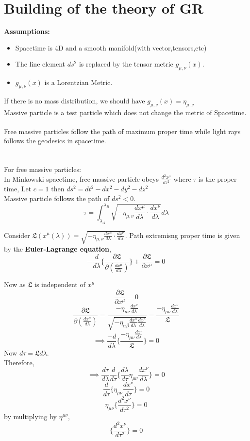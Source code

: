 \documentclass{article}
\begin{document}
\section{Building of the theory of GR}
\textbf{Assumptions: }
\begin{itemize}
    \item Spacetime is 4D and a smooth manifold(with vector,tensors,etc)
    \item The line element $ds^2$ is replaced by the tensor metric $g_{\mu,\nu}(x)$.
    \item $g_{\mu,\nu}(x)$ is a Lorentzian Metric.
\end{itemize} 
If there is no mass distribution, we should have $g_{\mu,\nu}(x)=\eta_{\mu,\nu} $
\\ Massive particle is a test particle which does not change the metric of Spacetime.
\\
 \\
Free massive particles follow the path of maximum proper time while light rays follows the geodesics in spacetime. 
\\ \\ \\
For free massive particles:
\\
In Minkowski spacetime, free massive particle obeys $\frac{d^2 x^\mu}{d \tau^2}$
where $\tau$ is the proper time, Let $c=1$ then  $ds^2 = dt^2-dx^2-dy^2-dz^2$
\\ Massive particle follows the path of $ds^2<0$. 
$$\tau = \int_{\lambda_A}^{\lambda_B} \sqrt{-\eta_{\mu,\nu}\frac{dx^\mu}{d\lambda} \cdot \frac{dx^\nu}{d\lambda}} d\lambda $$

Consider $\mathfrak{L}(x^\mu (\lambda)) = \sqrt{-\eta_{\mu,\nu}\frac{dx^\mu}{d\lambda} \cdot \frac{dx^\nu}{d\lambda}} $. Path extremisng  proper time is given by the \textbf{Euler-Lagrange equation},$$ \boxed{-\frac{d }{d \lambda} \{ \frac{\partial \mathfrak{L}}{\partial (\frac{dx^\mu}{ d\lambda})} \} + \frac{\partial \mathfrak{L}}{\partial x^\mu}= 0 }$$ 

Now as $\mathfrak{L}$ is independent of $x^{\mu}$ $$\frac{\partial \mathfrak{L}}{\partial x^\mu}= 0$$
$$ \frac{\partial \mathfrak{L}}{\partial (\frac{dx^\mu}{ d\lambda})} = \frac{-\eta_{\mu \nu} \frac{dx^\nu}{d\lambda}}{\sqrt{-\eta_{\alpha\beta} \frac{dx^\alpha}{d\lambda}\frac{dx^\beta}{d\lambda}}} = \frac{-\eta_{\mu \nu} \frac{dx^\nu}{d\lambda}}{\mathfrak{L}}  $$
$$\implies \frac{-d}{d\lambda} \{ \frac{-\eta_{\mu \nu} \frac{dx^\nu}{d\lambda}}{\mathfrak{L}}  \} = 0$$
Now $d\tau = \mathfrak{L} d\lambda$.\\
Therefore, $$\implies \frac{d\tau}{d\lambda} \frac{d}{d\tau} \{ \frac{d\lambda}{d\tau} \eta_{\mu \nu} \frac{dx^\nu}{d\lambda} \} = 0$$
$$\frac{d}{d\tau} \{\eta_{\mu \nu} \frac{dx^\nu}{d\tau} \} = 0$$
$$\eta_{\mu \nu} \{ \frac{d^2x^\nu}{d\tau^2} \} = 0$$
by multiplying by $\eta^{\mu\nu}$,$$\{ \frac{d^2x^\nu}{d\tau^2} \} = 0$$
\end{document}
